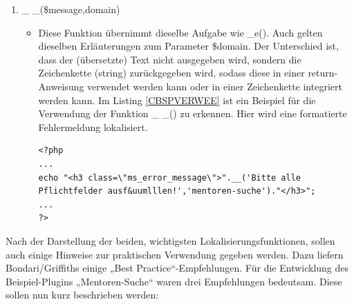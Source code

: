 \begin{enumerate}
\begin{itemize}
	\end{itemize}
	\item \_ \_(\$message,domain)
	\begin{itemize}
	\item Diese Funktion übernimmt dieselbe Aufgabe wie \_e(). Auch gelten dieselben Erläuterungen zum Parameter \$domain. Der Unterschied ist, dass der (übersetzte) Text nicht ausgegeben wird, sondern die Zeichenkette (string) zurückgegeben wird, sodass diese in einer return-Anweisung verwendet werden kann oder in einer Zeichenkette integriert werden kann.\newline
	Im Listing \ref{CBSPVERWEE} ist ein Beispiel für die Verwendung der Funktion \_ \_() zu erkennen. Hier wird 
eine formatierte Fehlermeldung lokalisiert.
\begin{lstlisting}
<?php 
...
echo "<h3 class=\"ms_error_message\">".__('Bitte alle Pflichtfelder ausf&uumlllen!','mentoren-suche')."</h3>";	
...
?> 
\end{lstlisting}		
\end{itemize}	 
\end{enumerate}   
Nach der Darstellung der beiden, wichtigsten Lokalisierungsfunktionen, sollen auch einige Hinweise zur praktischen Verwendung gegeben werden. Dazu liefern Bondari/Griffiths einige „Best Practice“-Empfehlungen. Für die Entwicklung des Beispiel-Plugins „Mentoren-Suche“ waren drei Empfehlungen bedeutsam. Diese sollen nun kurz beschrieben werden:
